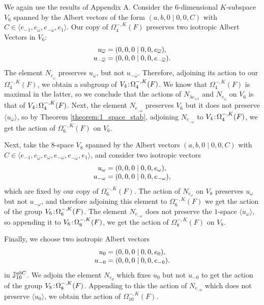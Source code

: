 We again use the results of Appendix A. Consider the $6$-dimensional
$K$-subspace $V_6$ spanned by the Albert vectors of the form 
$(a,b,0\mid 0,0,C)$ with $C \in \langle e_{-1}, e_{\bar{\omega}}, e_{-\bar{\omega}}, e_1 \rangle$.
Our copy of $\Omega_4^{-,K}(F)$ preserves two isotropic Albert Vectors in $V_6$: 
\begin{equation}
	\begin{array}{r@{\;}c@{\;}l}
		u_{\bar{\omega}} & = & (0,0,0\mid 0,0,e_{\bar{\omega}}), \\
		u_{-\bar{\omega}} & = & (0,0,0\mid 0,0,e_{-\bar{\omega}}). \\
	\end{array} 
\end{equation}
The element $N_{e_{\bar{\omega}}}$ preserves $u_{\bar{\omega}}$, but not $u_{-\bar{\omega}}$. 
Therefore, adjoining its action to our $\Omega_4^{-,K}(F)$, we obtain a subgroup of 
$V_4\mathord{{\;\!{:}\;\!}}\Omega_4^{-,K}(F)$. We know that $\Omega_4^{-,K}(F)$ is maximal in the latter, so 
we conclude that the actions of $N_{\lambda e_{\pm 1}}$ and $N_{e_{\bar{\omega}}}$ on 
$V_6$ is that of $V_4\mathord{{\;\!{:}\;\!}}\Omega_4^{-,K}(F)$. Next, the element $N_{e_{-\bar{\omega}}}$
preserves $V_6$ but it does not preserve $\langle u_{\bar{\omega}} \rangle$, so by Theorem
\ref{theorem:1_space_stab}, adjoining $N_{e_{-\bar{\omega}}}$ to $V_4\mathord{{\;\!{:}\;\!}}\Omega_4^{-,K}(F)$,
we get the action of $\Omega_6^{-,K}(F)$ on $V_6$.

Next, take the $8$-space $V_8$ spanned by the Albert vectors $(a,b,0\mid 0,0,C)$ with 
$C \in \langle e_{-1}, e_{\bar{\omega}}, e_{\omega}, 
e_{- \omega}, e_{-\bar{\omega}}, e_1 \rangle$, and consider two isotropic vectors
\begin{equation}
	\begin{array}{r@{\;}c@{\;}l}
		u_{\omega} & = & (0,0,0 \mid 0,0,e_{\omega}), \\
		u_{-\omega} & = & (0,0,0 \mid 0,0,e_{-\omega}),
	\end{array}
\end{equation}
which are fixed by our copy of $\Omega_6^{-,K}(F)$. The action of $N_{e_{\omega}}$ on $V_8$
preserves $u_{\omega}$ but not $u_{-\omega}$, and therefore adjoining this element to 
$\Omega_6^{-,K}(F)$ we get the action of the group $V_6\mathord{{\;\!{:}\;\!}}\Omega_6^{-,K}(F)$. The element
$N_{e_{-\omega}}$ does not preserve the $1$-space $\langle u_{\omega} \rangle$, so appending it to 
$V_6\mathord{{\;\!{:}\;\!}}\Omega_6^{-,K}(F)$, we get the action of $\Omega_8^{-,K}(F)$ on $V_8$. 

Finally, we choose two isotropic Albert vectors
\begin{equation}
	\begin{array}{r@{\;}c@{\;}l}
		u_0 & = & (0,0,0\mid 0,0,e_0), \\
		u_{-0} & = & (0,0,0\mid 0,0,e_{-0}).
	\end{array}
\end{equation}
in $\mathbb{J}_{10}^{abC}$. We adjoin the element $N_{e_{0}}$ which fixes $u_0$ but not $u_{-0}$ to 
get the action of the group $V_8\mathord{{\;\!{:}\;\!}} \Omega_8^{-,K}(F)$. Appending to this the action of
$N_{e_{-0}}$ which does not preserve $\langle u_0 \rangle$, we obtain the action of
$\Omega_{10}^{-,K}(F)$.


